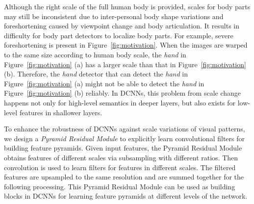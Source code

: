 \documentclass[10pt,twocolumn,letterpaper]{article}
\begin{document}
Although the right scale of the full human body is provided, scales for body parts may still be inconsistent due to inter-personal body shape variations and foreshortening caused by viewpoint change and body articulation. It results in difficulty for body part detectors to localize body parts. 
For example, severe foreshortening is present in Figure~\ref{fig:motivation}. 
When the images are warped to the same size according to human body scale, the \textit{hand} in Figure~\ref{fig:motivation} (a) has a larger scale than that in Figure~\ref{fig:motivation} (b). Therefore, the \textit{hand} detector that can detect the \textit{hand} in Figure~\ref{fig:motivation} (a) might not be able to detect the \textit{hand} in Figure~\ref{fig:motivation} (b) reliably. In DCNNs, this problem from scale change happens not only for high-level semantics in deeper layers, but also exists for low-level features in shallower layers.

%


To enhance the robustness of DCNNs against scale variations of visual patterns, we design a \textit{Pyramid Residual Module} to explicitly learn convolutional filters for building feature pyramids. 
Given input features, the Pyramid Residual Module obtains features of different scales via subsampling with different ratios. 
Then convolution is used to learn filters for features in different scales. 
The filtered features are upsampled to the same resolution and are summed together for the following processing. 
This Pyramid Residual Module can be used as building blocks in DCNNs for learning feature pyramids at different levels of the network.


\end{document}
